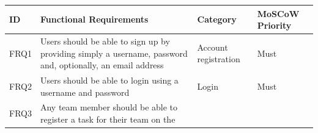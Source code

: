 \documentclass[12pt]{report}
\begin{document}
\begin{longtable}[]{@{}llll@{}}
\toprule
\begin{minipage}[b]{0.04\columnwidth}\raggedright\strut
ID\strut
\end{minipage} & \begin{minipage}[b]{0.64\columnwidth}\raggedright\strut
Functional Requirements\strut
\end{minipage} & \begin{minipage}[b]{0.12\columnwidth}\raggedright\strut
Category\strut
\end{minipage} & \begin{minipage}[b]{0.09\columnwidth}\raggedright\strut
MoSCoW Priority\strut
\end{minipage}\tabularnewline
\midrule
\endhead
\begin{minipage}[t]{0.04\columnwidth}\raggedright\strut
FRQ1\strut
\end{minipage} & \begin{minipage}[t]{0.64\columnwidth}\raggedright\strut
Users should be able to sign up by providing simply a username, password
and, optionally, an email address\strut
\end{minipage} & \begin{minipage}[t]{0.12\columnwidth}\raggedright\strut
Account registration\strut
\end{minipage} & \begin{minipage}[t]{0.09\columnwidth}\raggedright\strut
Must\strut
\end{minipage}\tabularnewline
\begin{minipage}[t]{0.04\columnwidth}\raggedright\strut
FRQ2\strut
\end{minipage} & \begin{minipage}[t]{0.64\columnwidth}\raggedright\strut
Users should be able to login using a username and password\strut
\end{minipage} & \begin{minipage}[t]{0.12\columnwidth}\raggedright\strut
Login\strut
\end{minipage} & \begin{minipage}[t]{0.09\columnwidth}\raggedright\strut
Must\strut
\end{minipage}\tabularnewline
\begin{minipage}[t]{0.04\columnwidth}\raggedright\strut
FRQ3\strut
\end{minipage} & \begin{minipage}[t]{0.64\columnwidth}\raggedright\strut
Any team member should be able to register a task for their team on the

\end{minipage}
\end{longtable}
\end{document}
